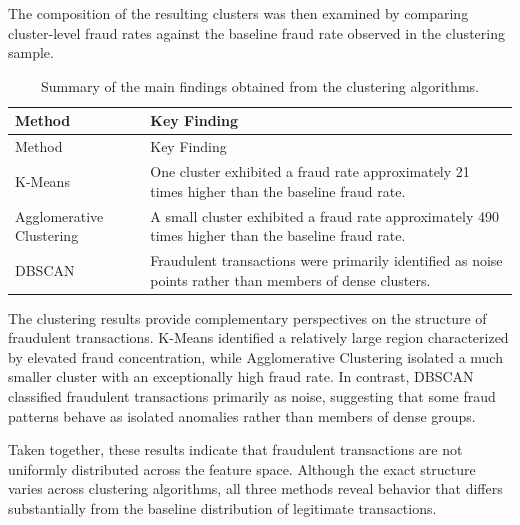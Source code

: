 \documentclass[
  12pt,
  letterpaper,
]{book}
\begin{document}
The composition of the resulting clusters was then examined by comparing
cluster-level fraud rates against the baseline fraud rate observed in
the clustering sample.

\begin{longtable}[]{@{}
  >{\centering\arraybackslash}p{}
  >{\centering\arraybackslash}p{}@{}}
\caption{Summary of the main findings obtained from the clustering
algorithms.}\label{tbl-clustering-summary}\tabularnewline
\toprule\noalign{}
\begin{minipage}[b]{\linewidth}\centering
Method
\end{minipage} & \begin{minipage}[b]{\linewidth}\centering
Key Finding
\end{minipage} \\
\midrule\noalign{}
\endfirsthead
\toprule\noalign{}
\begin{minipage}[b]{\linewidth}\centering
Method
\end{minipage} & \begin{minipage}[b]{\linewidth}\centering
Key Finding
\end{minipage} \\
\midrule\noalign{}
\endhead
\bottomrule\noalign{}
\endlastfoot
K-Means & One cluster exhibited a fraud rate approximately 21 times
higher than the baseline fraud rate. \\
Agglomerative Clustering & A small cluster exhibited a fraud rate
approximately 490 times higher than the baseline fraud rate. \\
DBSCAN & Fraudulent transactions were primarily identified as noise
points rather than members of dense clusters. \\
\end{longtable}

The clustering results provide complementary perspectives on the
structure of fraudulent transactions. K-Means identified a relatively
large region characterized by elevated fraud concentration, while
Agglomerative Clustering isolated a much smaller cluster with an
exceptionally high fraud rate. In contrast, DBSCAN classified fraudulent
transactions primarily as noise, suggesting that some fraud patterns
behave as isolated anomalies rather than members of dense groups.

Taken together, these results indicate that fraudulent transactions are
not uniformly distributed across the feature space. Although the exact
structure varies across clustering algorithms, all three methods reveal
behavior that differs substantially from the baseline distribution of
legitimate transactions.
\end{document}
